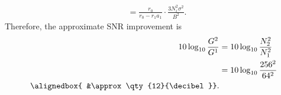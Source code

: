 \documentclass[
  coursecode={MTHE 477},
  assignmentname={Homework \homeworknumber},
  studentnumber=20053722,
  name={Bryan Hoang},
  draft,
]{
  ltxanswer%
}
\begin{document}
\begin{questions}
\begin{parts}
\begin{solution}
\begin{align*}
                &= \frac{r_{0}}{r_{0} - r_{1} a_{1}} \cdot \frac{3 N_{i}^{2} \sigma^{2}}{B^{2}}.
        \end{align*}
        Therefore, the approximate SNR improvement is
        \begin{align*}
          10 \log_{10} \frac{G^{2}}{G^{1}} &= 10 \log_{10} \frac{N_{2}^{2}}{N_{1}^{2}} \\
                                           &= 10 \log_{10} \frac{256^{2}}{64^{2}}      \\
          \alignedbox{                     &\approx \qty{12}{\decibel}}.
        \end{align*}
      \end{solution}
    \end{parts}
  \end{questions}
\end{document}
